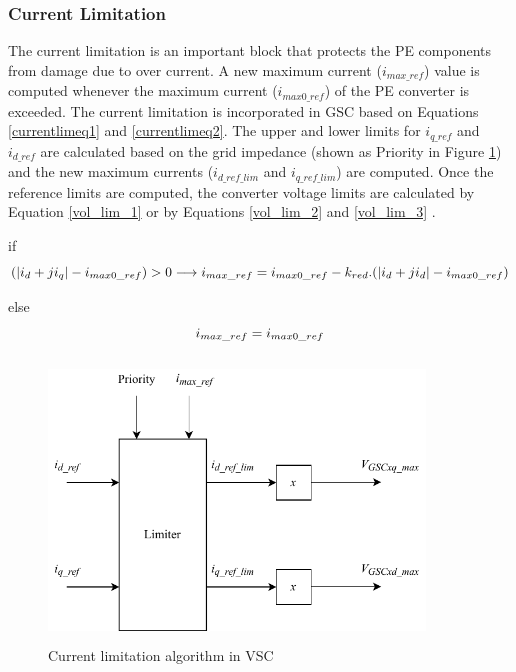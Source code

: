 \subsubsection{Current Limitation}\label{currentlimitation_RSCAD}
The current limitation is an important block that protects the \gls{PE} components from damage due to over current. A new maximum current ($i_{max\_ref}$) value is computed whenever the maximum current ($i_{max0\_ref}$) of the \gls{PE} converter is exceeded. The current limitation is incorporated in \gls{GSC} based on Equations \ref{currentlimeq1} and \ref{currentlimeq2}. The upper and lower limits for $i_{q\_ref}$ and $i_{d\_ref}$ are calculated based on the grid impedance (shown as Priority in Figure \ref{fig:Current_Limiter_block}) and the new maximum currents ($i_{d\_ref\_lim}$ and $i_{q\_ref\_lim}$) are computed. 
Once the reference limits are computed, the converter voltage limits are calculated by Equation \ref{vol_lim_1} or by Equations \ref{vol_lim_2} and \ref{vol_lim_3} \cite{korai_dynamic_2019}.

if
\begin{equation} \label{currentlimeq1}
  (|i_d+ji_q|-i_{max0\_ref})>0 \longrightarrow i_{max\_ref} = i_{max0\_ref} - k_{red} .(|i_d+ji_d|-i_{max0\_ref}) \\
\end{equation}

else
\begin{equation}\label{currentlimeq2}
    \\
  i_{max\_ref} = i_{max0\_ref}  
 \end{equation}
 
\begin{figure}[H]
\centering
    \includegraphics[height = 7.5cm,width = 10cm]{Diagrams/Chapter_3/Current_Limiter_block.pdf}
    \caption{Current limitation algorithm in VSC \cite{korai_dynamic_2019}}
    \label{fig:Current_Limiter_block}
\end{figure}


